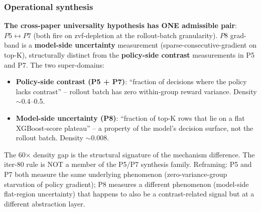 \subsubsection{Operational synthesis}
\textbf{The cross-paper universality hypothesis has ONE admissible pair}:
$P5 \leftrightarrow P7$ (both fire on zvf-depletion at the rollout-batch
granularity).  $P8$ grad-band is a \textbf{model-side uncertainty}
measurement (sparse-consecutive-gradient on top-K), structurally
distinct from the \textbf{policy-side contrast} measurements in P5 and P7.
The two super-domains:
\begin{itemize}
\item \textbf{Policy-side contrast (P5 + P7)}: ``fraction of decisions where
the policy lacks contrast'' -- rollout batch has zero within-group reward
variance.  Density $\sim$0.4--0.5.
\item \textbf{Model-side uncertainty (P8)}: ``fraction of top-K rows that
lie on a flat XGBoost-score plateau'' -- a property of the model's
decision surface, not the rollout batch.  Density $\sim$0.008.
\end{itemize}
The 60$\times$ density gap is the structural signature of the
mechanism difference.  The iter-80 rule is NOT a member of the
P5/P7 synthesis family.  Reframing: P5 and P7 both measure the same
underlying phenomenon (zero-variance-group starvation of policy gradient);
P8 measures a different phenomenon (model-side flat-region uncertainty)
that happens to also be a contrast-related signal but at a different
abstraction layer.